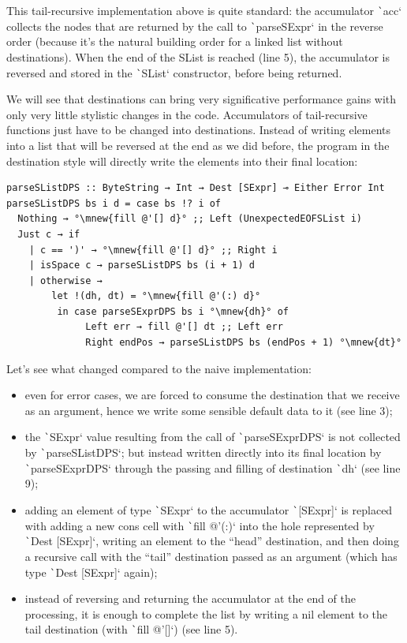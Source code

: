 \documentclass[english]{jflart}
\newcommand{\mnew}[1]{\colorbox{green}{#1}}
\begin{document}
This tail-recursive implementation above is quite standard: the accumulator \texttt`acc` collects the nodes that are returned by the call to \texttt`parseSExpr` in the reverse order (because it's the natural building order for a linked list without destinations). When the end of the SList is reached (line 5), the accumulator is reversed and stored in the \texttt`SList` constructor, before being returned.

We will see that destinations can bring very significative performance gains with only very little stylistic changes in the code. Accumulators of tail-recursive functions just have to be changed into destinations. Instead of writing elements into a list that will be reversed at the end as we did before, the program in the destination style will directly write the elements into their final location:

{\small
\begin{verbatim}
parseSListDPS :: ByteString → Int → Dest [SExpr] ⊸ Either Error Int
parseSListDPS bs i d = case bs !? i of
  Nothing → °\mnew{fill @'[] d}° ;; Left (UnexpectedEOFSList i)
  Just c → if
    | c == ')' → °\mnew{fill @'[] d}° ;; Right i
    | isSpace c → parseSListDPS bs (i + 1) d
    | otherwise →
        let !(dh, dt) = °\mnew{fill @'(:) d}°
         in case parseSExprDPS bs i °\mnew{dh}° of
              Left err → fill @'[] dt ;; Left err
              Right endPos → parseSListDPS bs (endPos + 1) °\mnew{dt}°
\end{verbatim}
}

Let's see what changed compared to the naive implementation:

\begin{itemize}
  \item even for error cases, we are forced to consume the destination that we receive as an argument, hence we write some sensible default data to it (see line 3);
  \item the \texttt`SExpr` value resulting from the call of \texttt`parseSExprDPS` is not collected by \texttt`parseSListDPS`; but instead written directly into its final location by \texttt`parseSExprDPS` through the passing and filling of destination \texttt`dh` (see line 9);
  \item adding an element of type \texttt`SExpr` to the accumulator \texttt`[SExpr]` is replaced with adding a new cons cell with \texttt`fill @'(:)` into the hole represented by \texttt`Dest [SExpr]`, writing an element to the ``head'' destination, and then doing a recursive call with the ``tail'' destination passed as an argument (which has type \texttt`Dest [SExpr]` again);
  \item instead of reversing and returning the accumulator at the end of the processing, it is enough to complete the list by writing a nil element to the tail destination (with \texttt`fill @'[]`) (see line 5).
\end{itemize}
\end{document}
